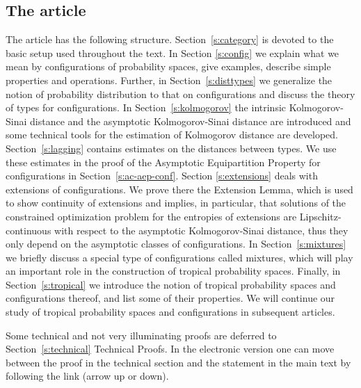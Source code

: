 \subsection{The article}
The article has the following structure. Section~\ref{s:category} is
devoted to the basic setup used throughout the text.  In Section
\ref{s:config} we explain what we mean by configurations of
probability spaces, give examples, describe simple properties and
operations. Further, in Section~\ref{s:disttypes} we generalize the
notion of probability distribution to that on configurations and
discuss the theory of types for configurations.  In
Section~\ref{s:kolmogorov} the intrinsic Kolmogorov-Sinai distance and
the asymptotic Kolmogorov-Sinai distance are introduced and some
technical tools for the estimation of Kolmogorov distance are
developed.  Section~\ref{s:lagging} contains estimates on the
distances between types.  We use these estimates in the proof of the
Asymptotic Equipartition Property for configurations in
Section~\ref{s:ac-aep-conf}.  Section \ref{s:extensions} deals with
extensions of configurations. We prove there the Extension Lemma,
which is used to show continuity of extensions and implies, in
particular, that solutions of the constrained optimization problem for
the entropies of extensions are Lipschitz-continuous with respect to
the asymptotic Kolmogorov-Sinai distance, thus they only depend on the
asymptotic classes of configurations.  In Section~\ref{s:mixtures} we
briefly discuss a special type of configurations called mixtures,
which will play an important role in the construction of tropical
probability spaces.  Finally, in Section~\ref{s:tropical} we introduce
the notion of tropical probability spaces and configurations thereof,
and list some of their properties. We will continue our study of
tropical probability spaces and configurations in subsequent articles.

Some technical and not very illuminating proofs are deferred to
Section~\ref{s:technical} Technical Proofs.  In the electronic version
one can move between the proof in the technical section and the
statement in the main text by following the link (arrow up or down).
